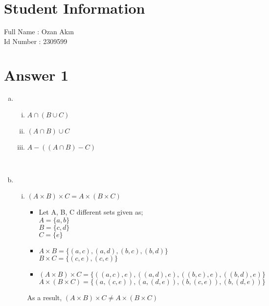 \documentclass[11pt]{article}
\begin{document}
\section*{Student Information } 
Full Name : Ozan Akın \\
Id Number : 2309599 \\

\section*{Answer 1}

\begin{enumerate}[a)]
    \item
        \begin{enumerate}[(i)]
            \item $A \cap (B \cup C)$
            \item $(A \cap B) \cup C$
            \item $A - ((A \cap B) - C)$
        \end{enumerate}{}
        ~ \\
    \item 
        \begin{enumerate}[(i)]
            \item $(A \times B) \times C  = A \times (B \times C)$
                \begin{itemize}
                    \item Let A, B, C different sets given as; \\
                        $A = \{a, b\}$ \\
                        $B = \{c, d\}$ \\
                        $C = \{e\}$
                    \item $A \times B = \{(a, c), (a, d), (b, c), (b, d)\}$ \\
                        $B \times C = \{(c, e), (c, e)\}$
                    \item $(A \times B) \times C = \{((a, c), e), ((a, d), e), ((b, c), e), ((b, d), e)\}$ \\
                        $A \times (B \times C) = \{(a, (c, e)), (a, (d, e)), (b, (c, e)), (b, (d, e))\} $
                \end{itemize}{}
            As a result, $(A \times B) \times C \neq A \times (B \times C)$ \\
            

\end{enumerate}
\end{enumerate}
\end{document}
